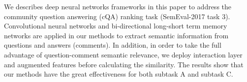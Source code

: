 We describes deep neural networks frameworks in this paper to address the community question answering (cQA) ranking task (SemEval-2017 task 3). Convolutional neural networks and bi-directional long-short term memory networks are applied in our methods to extract semantic information from questions and answers (comments). In addition, in order to take the full advantage of question-comment semantic relevance, we deploy interaction layer and augmented features before calculating the similarity. The results show that our methods have the great effectiveness for both subtask A and subtask C.

